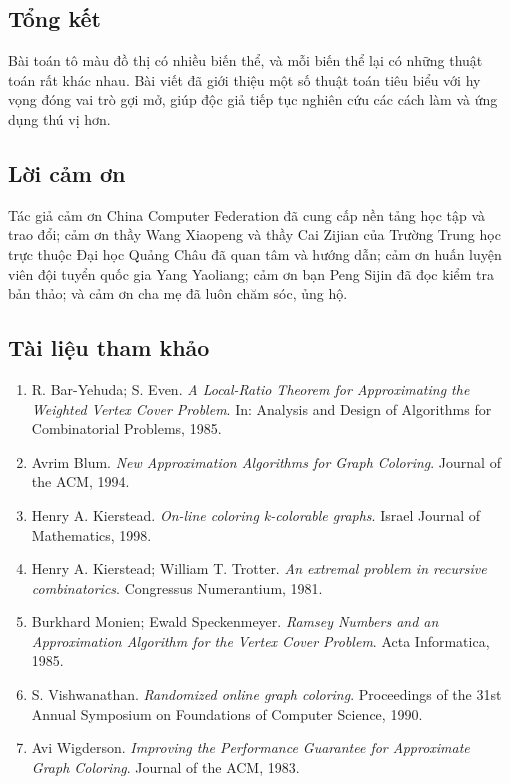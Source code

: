 \documentclass[11pt]{article}
\begin{document}
\subsection{Tổng kết}

Bài toán tô màu đồ thị có nhiều biến thể, và mỗi biến thể lại có những thuật
toán rất khác nhau. Bài viết đã giới thiệu một số thuật toán tiêu biểu với hy
vọng đóng vai trò gợi mở, giúp độc giả tiếp tục nghiên cứu các cách làm và ứng
dụng thú vị hơn.

\subsection*{Lời cảm ơn}

Tác giả cảm ơn China Computer Federation đã cung cấp nền tảng học tập và trao
đổi; cảm ơn thầy Wang Xiaopeng và thầy Cai Zijian của Trường Trung học trực
thuộc Đại học Quảng Châu đã quan tâm và hướng dẫn; cảm ơn huấn luyện viên đội
tuyển quốc gia Yang Yaoliang; cảm ơn bạn Peng Sijin đã đọc kiểm tra bản thảo;
và cảm ơn cha mẹ đã luôn chăm sóc, ủng hộ.

\subsection*{Tài liệu tham khảo}

\begin{enumerate}
  \item R. Bar-Yehuda; S. Even. \emph{A Local-Ratio Theorem for Approximating
  the Weighted Vertex Cover Problem}. In: Analysis and Design of Algorithms
  for Combinatorial Problems, 1985.
  \item Avrim Blum. \emph{New Approximation Algorithms for Graph Coloring}.
  Journal of the ACM, 1994.
  \item Henry A. Kierstead. \emph{On-line coloring k-colorable graphs}. Israel
  Journal of Mathematics, 1998.
  \item Henry A. Kierstead; William T. Trotter. \emph{An extremal problem in
  recursive combinatorics}. Congressus Numerantium, 1981.
  \item Burkhard Monien; Ewald Speckenmeyer. \emph{Ramsey Numbers and an
  Approximation Algorithm for the Vertex Cover Problem}. Acta Informatica,
  1985.
  \item S. Vishwanathan. \emph{Randomized online graph coloring}. Proceedings
  of the 31st Annual Symposium on Foundations of Computer Science, 1990.
  \item Avi Wigderson. \emph{Improving the Performance Guarantee for
  Approximate Graph Coloring}. Journal of the ACM, 1983.
\end{enumerate}
\end{document}
